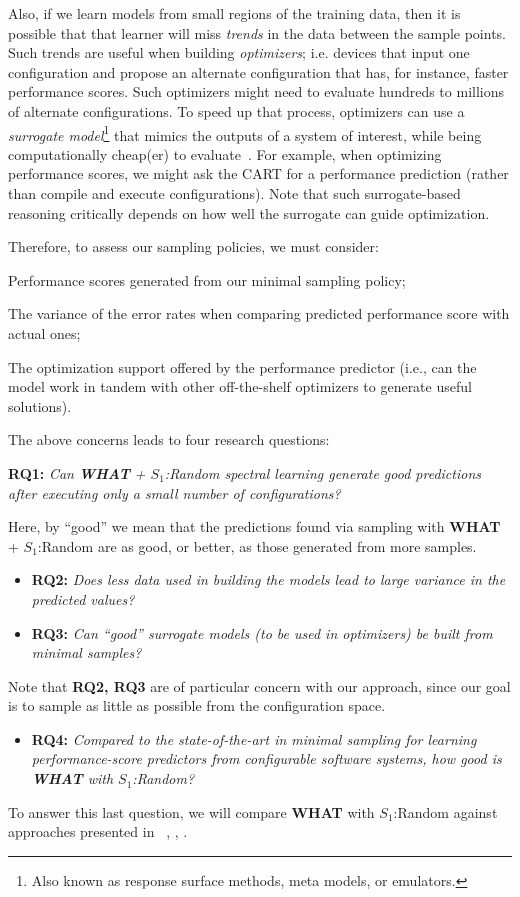 \documentclass{sig-alternative}
\newcommand{\bi}{\begin{itemize}}%
\newcommand{\ei}{\end{itemize}}
\newcommand{\what}{{\bf WHAT }}
\begin{document}
Also, if we learn models from small regions of the training data,
then it is  possible that that learner will miss {\em trends} in the data
between the sample points. Such trends are useful when building {\em optimizers};
i.e. devices that input one configuration and propose an alternate
configuration that has, for instance, faster performance scores. Such optimizers might
need to evaluate hundreds to millions of alternate configurations. 
To speed up that process, optimizers can use a {\em surrogate model}\footnote{Also known as response surface methods, meta models, or emulators.}
that  mimics the outputs of a system of interest, while being computationally cheap(er) to evaluate~\cite{loshchilov13}. For example, when optimizing
performance scores, we might ask the CART  for a performance
prediction (rather than compile and execute
configurations).  Note that such surrogate-based
reasoning critically depends on how well the surrogate can guide optimization.


Therefore, to assess our sampling policies, we must consider:
\begin{compactitem}
\item Performance scores generated from our minimal sampling policy;
\item The variance of the error rates when comparing predicted performance score with actual ones;
\item The optimization support offered by the performance predictor (i.e., can the model work in tandem with other off-the-shelf optimizers to generate useful solutions).
\end{compactitem}
The above concerns leads to four research questions:
\begin{compactitem}
\item {\bf RQ1:} {\em Can  \what  + $S_1$:Random spectral learning generate good predictions after
executing only a small number of configurations?}
\end{compactitem}
Here, by ``good'' we mean that the predictions found via sampling with \what + $S_1$:Random are as good, or better,
as those generated from more samples.
\bi
\item {\bf RQ2:} {\em
Does less data used in building the models lead to large variance in the predicted values?}
\item {\bf RQ3:} {\em
Can ``good'' surrogate models (to be used in optimizers)
be built from minimal samples?}
\ei
Note that {\bf RQ2, RQ3} are of particular concern with our approach,
since our goal is to sample as little as possible from the configuration space.
\bi
\item {\bf RQ4:} {\em Compared to the state-of-the-art in minimal sampling for
learning performance-score predictors from configurable software systems, how good is \what with $S_1$:Random?}
\ei
To answer this last question, we will compare \what with $S_1$:Random
          against approaches presented in ~\cite{siegmund2012predicting}, \cite{guo2013variability}, \cite{sarkar2015cost}.
 
\end{document}
